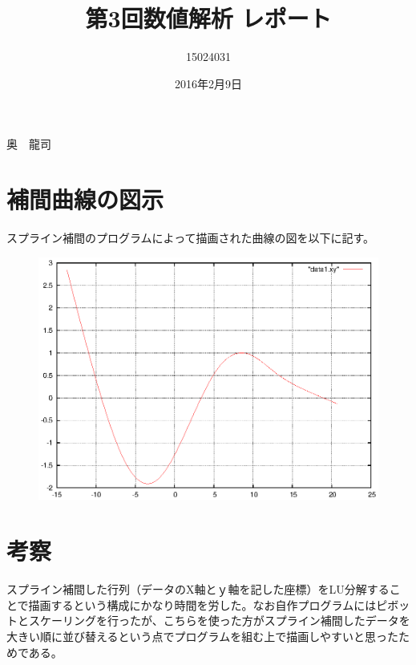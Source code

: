 \documentclass[a4j,titlepage]{jarticle}
\begin{document}

\title{第3回数値解析 レポート}

\author{15024031}{奥　龍司}

\date{2016年2月9日}
\maketitle



\section{補間曲線の図示}
スプライン補間のプログラムによって描画された曲線の図を以下に記す。
\begin{figure}[h]
    \includegraphics[width=30cm,bb=0 0 696 242]{data1graph.eps}
    \end{figure}

\section{考察}
 スプライン補間した行列（データのX軸とｙ軸を記した座標）をLU分解することで描画するという構成にかなり時間を労した。なお自作プログラムにはピボットとスケーリングを行ったが、こちらを使った方がスプライン補間したデータを大きい順に並び替えるという点でプログラムを組む上で描画しやすいと思ったためである。
\end{document}
